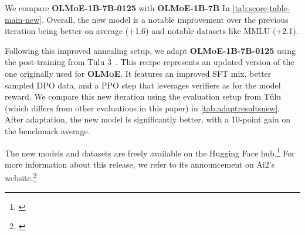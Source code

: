 \documentclass{article}
\newcommand{\model}{\textbf{\textsc{OLMoE}}}
\newcommand{\modelsmall}{\textbf{\textsc{OLMoE-1B-7B}}}
\newcommand{\modelsmallnew}{\textbf{\textsc{OLMoE-1B-7B-0125}}}
\begin{document}
We compare \modelsmallnew{} with \modelsmall{} In \autoref{tab:score-table-main-new}. Overall, the new model is a notable improvement over the previous iteration being better on average (+1.6) and notable datasets like MMLU (+2.1). 

Following this improved annealing setup, we adapt \modelsmallnew{} using the post-training from T{\"u}lu 3~\citep{lambert2025tulu3pushingfrontiers}. This recipe represents an updated version of the one originally used for \model{}. It features an improved SFT mix, better sampled DPO data, and a PPO step that leverages verifiers as for the model reward.  We compare this new iteration using the evaluation setup from T{\"u}lu (which differs from other evaluations in this paper) in \autoref{tab:adaptresultsnew}. After adaptation, the new model is significantly better, with a 10-point gain on the benchmark average.

The new models and datasets are freely available on the Hugging Face hub.\footnote{\href{https://hf.co/collections/allenai/olmoe-january-2025-67992134f9ebea0a941706ca}{}} For more information about this release, we refer to its announcement on Ai2's website.\footnote{\href{https://web.archive.org/web/20250212023046/https://allenai.org/blog/olmoe-app}{}}
\end{document}
